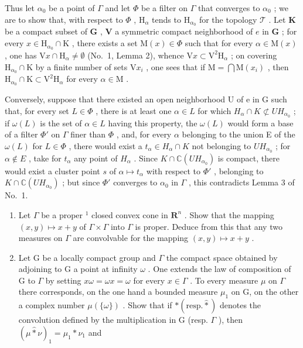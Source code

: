 Thus let \(\alpha_0\) be a point of \(\Gamma\) and let \(\Phi\) be a filter on \(\Gamma\) that converges to \(\alpha_0\) ; we are to show that, with respect to \(\Phi\) , \(\mathrm{H}_{\alpha}\) tends to \(\mathrm{H}_{\alpha_0}\) for the topology \(\mathcal{T}\) . Let \(\mathbf{K}\) be a compact subset of \(\mathbf{G}\) , \(\mathbf{V}\) a symmetric compact neighborhood of \(e\) in \(\mathbf{G}\) ; for every \(x \in \mathrm{H}_{\alpha_0} \cap \mathrm{K}\) , there exists a set \(\mathrm{M}(x) \in \Phi\) such that for every \(\alpha \in \mathrm{M}(x)\) , one has \(\mathrm{V}x \cap \mathrm{H}_{\alpha} \neq \emptyset\) (No.~1, Lemma 2), whence \(\mathrm{V}x \subset \mathrm{V}^2\mathrm{H}_{\alpha}\) ; on covering \(\mathrm{H}_{\alpha_0} \cap \mathrm{K}\) by a finite number of sets \(\mathrm{V}x_i\) , one sees that if \(\mathrm{M} = \bigcap \mathrm{M}(x_i)\) , then \(\mathrm{H}_{\alpha_0} \cap \mathrm{K} \subset \mathrm{V}^2\mathrm{H}_{\alpha}\) for every \(\alpha \in \mathrm{M}\) .

Conversely, suppose that there existed an open neighborhood U of e in G such that, for every set \(L \in \Phi\) , there is at least one \(\alpha \in L\) for which \(H_{\alpha} \cap K \not\subset UH_{\alpha_{0}}\) ; if \(\omega(L)\) is the set of \(\alpha \in L\) having this property, the \(\omega(L)\) would form a base of a filter \(\Phi'\) on \(\Gamma\) finer than \(\Phi\) , and, for every \(\alpha\) belonging to the union E of the \(\omega(L)\) for \(L \in \Phi\) , there would exist a \(t_{\alpha} \in H_{\alpha} \cap K\) not belonging to \(UH_{\alpha_0}\) ; for \(\alpha \notin E\) , take for \(t_{\alpha}\) any point of \(H_{\alpha}\) . Since \(K \cap \mathbb{C}(UH_{\alpha_0})\) is compact, there would exist a cluster point \(s\) of \(\alpha \mapsto t_{\alpha}\) with respect to \(\Phi'\) , belonging to \(K \cap \mathbb{C}(UH_{\alpha_0})\) ; but since \(\Phi'\) converges to \(\alpha_0\) in \(\Gamma\) , this contradicts Lemma 3 of No.~1.


\exercisesection{}

\begin{enumerate}
\def\labelenumi{\arabic{enumi})}
\item
  Let \(\Gamma\) be a proper \(^{1}\) closed convex cone in \(\mathbf{R}^{n}\) . Show that the mapping \((x,y)\mapsto x+y\) of \(\Gamma\times\Gamma\) into \(\Gamma\) is proper. Deduce from this that any two measures on \(\Gamma\) are convolvable for the mapping \((x,y)\mapsto x+y\) .
\item
  Let G be a locally compact group and \(\Gamma\) the compact space obtained by adjoining to G a point at infinity \(\omega\) . One extends the law of composition of G to \(\Gamma\) by setting \(x\omega = \omega x = \omega\) for every \(x \in \Gamma\) . To every measure \(\mu\) on \(\Gamma\) there corresponds, on the one hand a bounded measure \(\mu_{1}\) on G, on the other a complex number \(\mu(\{\omega\})\) . Show that if \(*(\text{resp.}\widehat{*})\) denotes the convolution defined by the multiplication in G (resp. \(\Gamma\) ), then \((\mu\widehat{*}\nu)_{1} = \mu_{1}*\nu_{1}\) and
\end{enumerate}

